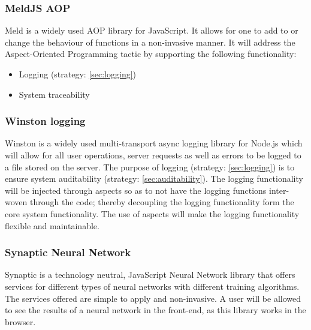 \subsubsection{MeldJS AOP}
Meld is a widely used AOP library for JavaScript. It allows for one to add to or change the behaviour of functions in a  non-invasive manner. It will address the Aspect-Oriented Programming tactic by supporting the following functionality:
\begin{itemize}
	\item Logging (strategy: \ref{sec:logging})
	\item System traceability				
\end{itemize}


\subsubsection{Winston logging}
Winston is a widely used multi-transport async logging library for Node.js which will allow for all user operations, server requests as well as errors to be logged to a file stored on the server. The purpose of logging (strategy: \ref{sec:logging}) is to ensure system auditability (strategy: \ref{sec:auditability}). The logging functionality will be injected through aspects so as to not have the logging functions inter-woven through the code; thereby decoupling the logging functionality form the core system functionality. The use of aspects will make the logging functionality flexible and maintainable.


\subsubsection{Synaptic Neural Network}
Synaptic is a technology neutral, JavaScript Neural Network library that offers services for different types of neural networks with different training algorithms. The services offered are simple to apply and non-invasive. A user will be allowed to see the results of a neural network in the front-end, as this library works in the browser.







